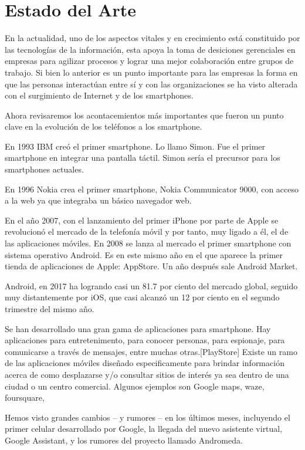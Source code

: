 \section{Estado del Arte}
En la actualidad, uno de los aspectos vitales y en crecimiento está constituido por las tecnologías 
de la información, esta apoya la toma de desiciones gerenciales en empresas para agilizar procesos y 
lograr una mejor colaboración entre grupos de trabajo. 
Si bien lo anterior es un punto importante para las empresas la forma en que las personas 
interactúan entre sí y con las organizaciones se ha visto alterada con el surgimiento de Internet y 
de los smartphones.\cite{TI}

Ahora revisaremos los acontacemientos más importantes que fueron un punto clave en la evolución
de los teléfonos a los smartphone.

En 1993 IBM creó el primer smartphone. Lo llamo Simon. Fue el primer smartphone en integrar una 
pantalla táctil. Simon sería el precursor para los smartphones actuales.\cite{Simon}

En 1996 Nokia crea el primer smartphone, Nokia Communicator 9000, con acceso a la web ya  que 
integraba un básico navegador web.\cite{Nokia}

En el año 2007, con el lanzamiento del primer iPhone por parte de Apple se revolucionó el mercado 
de la telefonía móvil y por tanto, muy ligado a él, el de las aplicaciones móviles.
En 2008 se lanza al mercado el primer smartphone con sistema operativo Android. Es en este mismo año 
en el que aparece la primer tienda de aplicaciones de Apple: AppStore. Un año después sale Android 
Market. \cite{Rioja}

Android, en 2017 ha logrando casi un 81.7 por ciento del mercado global, seguido muy distantemente por iOS, 
que casi alcanzó un 12 por ciento en el segundo trimestre del mismo año.\cite{IDC}

Se han desarrollado una gran gama de aplicaciones para smartphone. Hay aplicaciones 
para entretenimento, para conocer personas, para espionaje, para comunicarse a través de mensajes, 
entre muchas otras.[PlayStore] Existe un ramo de las aplicaciones móviles diseñado especificamente para 
brindar información acerca de como desplazarse y/o consultar sitios de interés ya sea dentro de una ciudad 
o un centro comercial. Algunos ejemplos son Google maps, waze, foursquare, 






Hemos visto grandes cambios -- y rumores -- en los últimos meses, incluyendo el primer celular desarrollado 
por Google, la llegada del nuevo asistente virtual, Google Assistant, y los rumores del proyecto llamado 
Andromeda.

